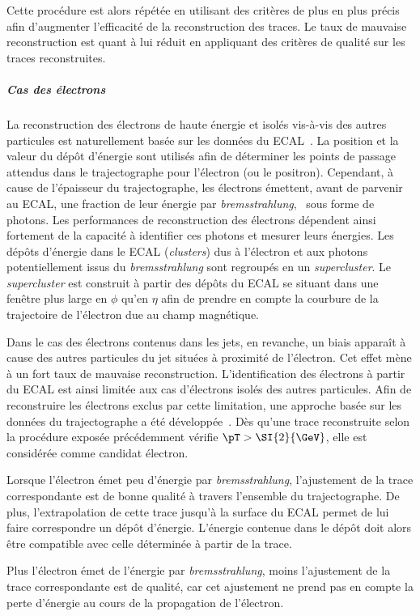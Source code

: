 Cette procédure est alors répétée en utilisant des critères de plus en plus précis afin d'augmenter l'efficacité de la reconstruction des traces.
Le taux de mauvaise reconstruction est quant à lui réduit en appliquant des critères de qualité sur les traces reconstruites.
\subparagraph{Cas des électrons}
La reconstruction des électrons de haute énergie et isolés vis-à-vis des autres particules est naturellement basée sur les données du ECAL~\cite{electron_reco_8tev}.
La position et la valeur du dépôt d'énergie sont utilisés afin de déterminer les points de passage attendus dans le trajectographe pour l'électron (ou le positron).
Cependant, à cause de l'épaisseur du trajectographe, les électrons émettent, avant de parvenir au ECAL, une fraction de leur énergie par \emph{bremsstrahlung}, \ie\ sous forme de photons.
Les performances de reconstruction des électrons dépendent ainsi fortement de la capacité à identifier ces photons et mesurer leurs énergies.
Les dépôts d'énergie dans le ECAL (\emph{clusters}) dus à l'électron et aux photons potentiellement issus du \emph{bremsstrahlung} sont regroupés en un \emph{supercluster}.
Le \emph{supercluster} est construit à partir des dépôts du ECAL se situant dans une fenêtre plus large en $\phi$ qu'en $\eta$ afin de prendre en compte la courbure de la trajectoire de l'électron due au champ magnétique.
\par
Dans le cas des électrons contenus dans les jets, en revanche, un biais apparaît à cause des autres particules du jet situées à proximité de l'électron.
Cet effet mène à un fort taux de mauvaise reconstruction.
L'identification des électrons à partir du ECAL est ainsi limitée aux cas d'électrons isolés des autres particules.
Afin de reconstruire les électrons exclus par cette limitation, une approche basée sur les données du trajectographe a été développée~\cite{particle-flow}.
Dès qu'une trace reconstruite selon la procédure exposée précédemment vérifie $\pT>\SI{2}{\GeV}$, elle est considérée comme candidat électron.
\par
Lorsque l'électron émet peu d'énergie par \emph{bremsstrahlung}, l'ajustement de la trace correspondante est de bonne qualité à travers l'ensemble du trajectographe.
De plus, l'extrapolation de cette trace jusqu'à la surface du ECAL permet de lui faire correspondre un dépôt d'énergie.
L'énergie contenue dans le dépôt doit alors être compatible avec celle déterminée à partir de la trace.
\par
Plus l'électron émet de l'énergie par \emph{bremsstrahlung}, moins l'ajustement de la trace correspondante est de qualité, car cet ajustement ne prend pas en compte la perte d'énergie au cours de la propagation de l'électron.
